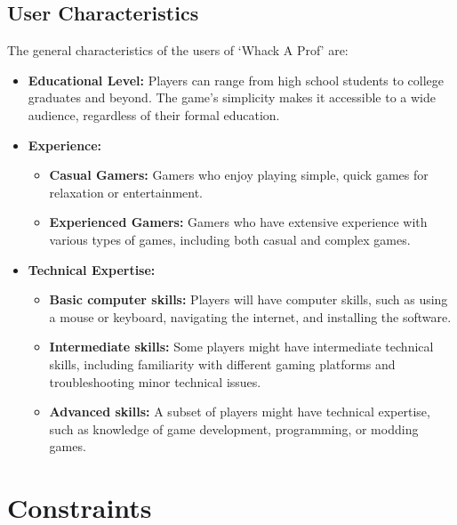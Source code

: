 \documentclass{article}
\begin{document}
\subsection{User Characteristics}
The general characteristics of the users of ‘Whack A Prof’ are:
\begin{itemize}
    \item \textbf{Educational Level:} Players can range from high school students to college graduates and beyond. The game’s simplicity makes it accessible to a wide audience, regardless of their formal education.
    \item \textbf{Experience:} 
    \begin{itemize}
        \item \textbf{Casual Gamers:} Gamers who enjoy playing simple, quick games for relaxation or entertainment.
        \item \textbf{Experienced Gamers:} Gamers who have extensive experience with various types of games, including both casual and complex games.
    \end{itemize}
    \item \textbf{Technical Expertise:} 
    \begin{itemize}
        \item \textbf{Basic computer skills:} Players will have computer skills, such as using a mouse or keyboard, navigating the internet, and installing the software.
        \item \textbf{Intermediate skills:} Some players might have intermediate technical skills, including familiarity with different gaming platforms and troubleshooting minor technical issues.
        \item \textbf{Advanced skills:} A subset of players might have technical expertise, such as knowledge of game development, programming, or modding games.
    \end{itemize}
\end{itemize}

\section{Constraints}
\end{document}
